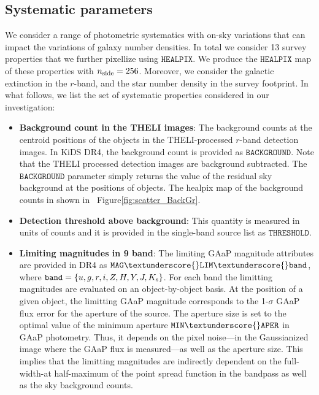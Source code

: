 \documentclass[fleqn,usenatbib,useAMS]{mnras}
\newcommand{\healpix}{\mathtt{HEALPIX}}
\begin{document}
\subsection{Systematic parameters}

We consider a range of photometric systematics with on-sky variations that can impact the variations of galaxy number densities. In total we consider 13 survey properties that we further pixellize using $\healpix$. We produce the $\healpix$ map of these properties with $n_{\rm side} = 256$. Moreover, we consider the galactic extinction in the $r$-band, and the star number density in the survey footprint. In what follows, we list the set of systematic properties considered in our investigation:

\begin{itemize}

  \item \textbf{Background count in the THELI images}: The background counts at the centroid positions of the objects in the THELI-processed $r$-band detection images. In KiDS DR4, the background count is provided as $\mathtt{BACKGROUND}$. Note that the THELI processed detection images are background subtracted. The $\mathtt{BACKGROUND}$ parameter simply returns the value of the residual sky background at the positions of objects. The healpix map of the background counts in shown in~ Figure\ref{fig:scatter_BackGr}.

  \item \textbf{Detection threshold above background}: This quantity is measured in units of counts and it is provided in the single-band source list as $\mathtt{THRESHOLD}$. 
  
  \item \textbf{Limiting magnitudes in 9 band}: The limiting GAaP magnitude attributes are provided in DR4 as $\mathtt{MAG}\textunderscore{}\mathtt{LIM}\textunderscore{} \mathtt{band}$, where $\mathtt{band} = \{u,g,r,i,Z,H,Y,J,K_{\rm s}\}$. 
  For each band the limitting magnitudes are evaluated on an object-by-object basis. At the position of a given object, the limitting GAaP magnitude corresponds to the 1-$\sigma$ GAaP flux error for the aperture of the source. The aperture size is set to the optimal value of the minimum aperture $\mathtt{MIN}\textunderscore{}\mathtt{APER}$ in GAaP photometry. Thus, it depends on the pixel noise---in the Gaussianized image where the GAaP flux is measured---as well as the aperture size. This implies that the limitting magnitudes are indirectly dependent on the full-width-at half-maximum of the point spread function in the bandpass as well as the sky background counts.   
  

\end{itemize}
\end{document}
